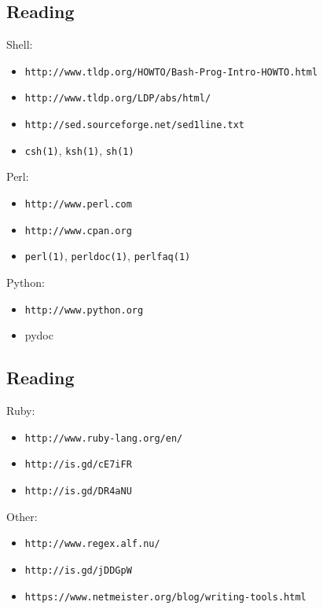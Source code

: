 \documentclass[xga]{xdvislides}
\begin{document}
\subsection{Reading}
Shell:
\begin{itemize}
	\item \verb+http://www.tldp.org/HOWTO/Bash-Prog-Intro-HOWTO.html+
	\item \verb+http://www.tldp.org/LDP/abs/html/+
	\item \verb+http://sed.sourceforge.net/sed1line.txt+
	\item \verb+csh(1)+, \verb+ksh(1)+, \verb+sh(1)+
\end{itemize}
Perl:
\begin{itemize}
	\item \verb+http://www.perl.com+
	\item \verb+http://www.cpan.org+
	\item \verb+perl(1)+, \verb+perldoc(1)+,
	\verb+perlfaq(1)+
\end{itemize}
Python:
\begin{itemize}
	\item \verb+http://www.python.org+
	\item pydoc
\end{itemize}

\subsection{Reading}
Ruby:
\begin{itemize}
	\item \verb+http://www.ruby-lang.org/en/+
	\item \verb+http://is.gd/cE7iFR+
	\item \verb+http://is.gd/DR4aNU+
\end{itemize}

Other:
\begin{itemize}
	\item \verb+http://www.regex.alf.nu/+
	\item \verb+http://is.gd/jDDGpW+
	\item \verb+https://www.netmeister.org/blog/writing-tools.html+
\end{itemize}
\end{document}
